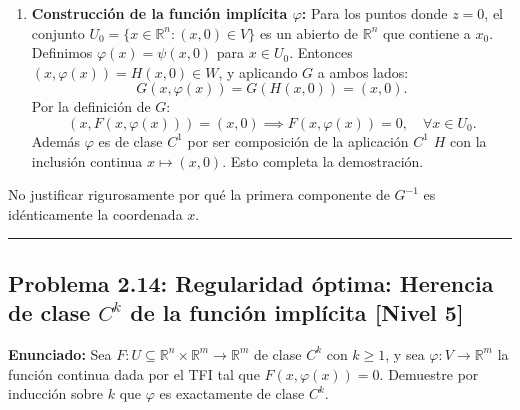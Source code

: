 \documentclass[11pt,a4paper]{article}
\begin{document}
\begin{enumerate}[label=\textbf{\arabic*.}]
\item \textbf{Construcción de la función implícita $\varphi$:}
Para los puntos donde $z = 0$, el conjunto $U_0 = \{x \in \mathbb{R}^n : (x, 0) \in V\}$ es un abierto de $\mathbb{R}^n$ que contiene a $x_0$.
Definimos $\varphi(x) = \psi(x, 0)$ para $x \in U_0$.
Entonces $(x, \varphi(x)) = H(x, 0) \in W$, y aplicando $G$ a ambos lados:
\begin{equation*}
G(x, \varphi(x)) = G(H(x, 0)) = (x, 0).
\end{equation*}
Por la definición de $G$:
\begin{equation*}
(x, F(x, \varphi(x))) = (x, 0) \implies F(x, \varphi(x)) = 0, \quad \forall x \in U_0.
\end{equation*}
Además $\varphi$ es de clase $C^1$ por ser composición de la aplicación $C^1$ $H$ con la inclusión continua $x \mapsto (x, 0)$. Esto completa la demostración.
\end{enumerate}

\begin{trapbox}
No justificar rigurosamente por qué la primera componente de $G^{-1}$ es idénticamente la coordenada $x$.
\end{trapbox}

\vspace{0.5cm}
\hrule
\vspace{0.5cm}

\subsection*{Problema 2.14: Regularidad óptima: Herencia de clase $C^k$ de la función implícita \hfill \color{primaryblue}\small[Nivel 5]}

\begin{tcolorbox}[colback=white,colframe=gray!40,arc=1mm,boxrule=0.5pt,left=3mm,right=3mm,top=2mm,bottom=2mm]
\textbf{Enunciado:} Sea $F: U \subseteq \mathbb{R}^n \times \mathbb{R}^m \to \mathbb{R}^m$ de clase $C^k$ con $k \ge 1$, y sea $\varphi: V \to \mathbb{R}^m$ la función continua dada por el TFI tal que $F(x, \varphi(x)) = 0$. Demuestre por inducción sobre $k$ que $\varphi$ es exactamente de clase $C^k$.
\end{tcolorbox}
\end{document}
